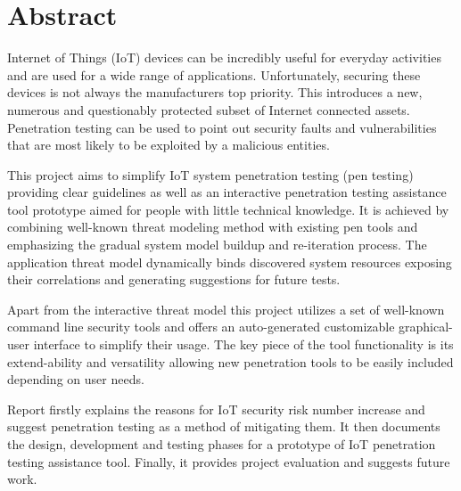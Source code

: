 


\section{Abstract}

Internet of Things (IoT) devices can be incredibly useful for everyday activities and are used for a wide range of applications. Unfortunately, securing these devices is not always the manufacturers top priority. This introduces a new, numerous and questionably protected subset of Internet connected assets. Penetration testing can be used to point out security faults and vulnerabilities that are most likely to be exploited by a malicious entities. 

This project aims to simplify IoT system penetration testing (pen testing) providing clear guidelines as well as an interactive penetration testing assistance tool prototype aimed for people with little technical knowledge. It is achieved by combining well-known threat modeling method with existing pen tools and emphasizing the gradual system model buildup and re-iteration process. The application threat model dynamically binds discovered system resources exposing their correlations and generating suggestions for future tests.

Apart from the interactive threat model this project utilizes a set of well-known command line security tools and offers an auto-generated customizable graphical-user interface to simplify their usage. The key piece of the tool functionality is its extend-ability and versatility allowing new penetration tools to be easily included depending on user needs.

Report firstly explains the reasons for IoT security risk number increase and suggest penetration testing as a method of mitigating them. It then documents the design, development and testing phases for a prototype of IoT penetration testing assistance tool. Finally, it provides project evaluation and suggests future work.